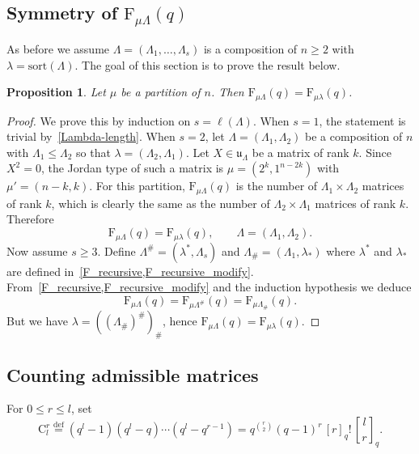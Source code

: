 \documentclass[12pt,a4paper,reqno]{amsart}
\theoremstyle{plain}
\newtheorem{proposition}[theorem]{Proposition}
\theoremstyle{definition}
\newcommand{\defin}{\overset{\mathrm{def}}{=}}
\newcommand{\1}{\mathds{1}}
\newcommand{\F}{\mathrm{F}}
\renewcommand{\u}{\mathfrak{u}}
\begin{document}
\subsection{Symmetry of $\F_{\mu\Lambda}(q)$}\label{Symmetry} As before we assume $\Lambda=(\Lambda_1,\dots,\Lambda_s)$ is a composition of $n\geq 2$ with $\lambda=\mathrm{sort}(\Lambda)$. The goal of this section is to prove the result below. 
\begin{proposition}\label{symmetry_prop} Let $\mu$ be a partition of $n$. Then $\F_{\mu\Lambda}(q)=\F_{\mu\lambda}(q)$.
\end{proposition}
\begin{proof}
    We prove this by induction on $s=\ell(\Lambda)$. When $s = 1$, the statement is trivial by~\cref{Lambda-length}. When $s=2$, let $\Lambda = (\Lambda_1, \Lambda_2)$ be a composition of $n$ with $\Lambda_1 \leq \Lambda_2$ so that $\lambda = (\Lambda_2, \Lambda_1)$. Let $X \in \u_\Lambda$ be a matrix of rank $k$. Since $X^2 = 0$, the Jordan type of such a matrix is $\mu = (2^k, 1^{n-2k})$ with $\mu' = (n-k, k)$. For this partition, $\F_{\mu\Lambda}(q)$ is the number of $\Lambda_1 \times \Lambda_2$ matrices of rank $k$, which is clearly the same as the number of $\Lambda_2 \times \Lambda_1$ matrices of rank $k$.
Therefore 
\begin{equation}\label{eq_Sym_s=2}
    \F_{\mu\Lambda}(q)=\F_{\mu\lambda}(q),\qquad \Lambda=(\Lambda_1,\Lambda_2). 
\end{equation}
Now assume $s\geq 3$. Define $\Lambda^\#=(\lambda^*,\Lambda_s)$ and $\Lambda_\#=(\Lambda_1,\lambda_*)$ where $\lambda^*$ and $\lambda_*$ are defined in~\cref{F_recursive,F_recursive_modify}.  From~\cref{F_recursive,F_recursive_modify} and the induction hypothesis we deduce 
\begin{equation}
    \F_{\mu\Lambda}(q)=\F_{\mu\Lambda^\#}(q)=\F_{\mu\Lambda_\#}(q).
\end{equation}
But we have $\lambda=((\Lambda_\#)^\#)_\#$, hence $\F_{\mu\Lambda}(q)=\F_{\mu\lambda}(q)$. 
\end{proof}


\subsection{Counting admissible matrices}
For $0\leq r\leq l$, set 
\begin{equation}\label{Cnr}
    \mathrm{C}_l^r\defin \left(q^l-1\right)\left(q^l-q\right)\cdots\left(q^l-q^{r-1}\right)=q^{\binom{r}{2}}(q-1)^r\,[r]_q!\, {l\brack r}_q. 
\end{equation}
\end{document}
